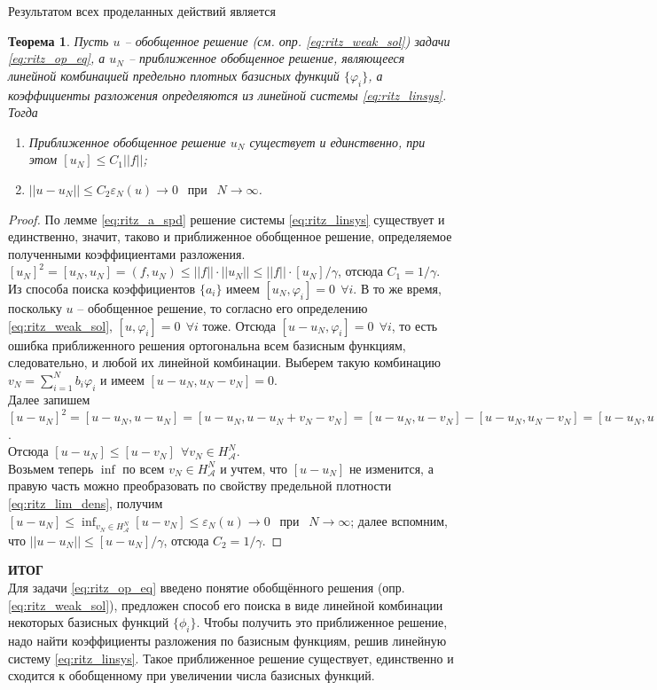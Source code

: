 \documentclass[a4paper, 11pt]{article}
\newtheorem{theorem}{Теорема}
\begin{document}
Результатом всех проделанных действий является
\begin{theorem}
	Пусть $u$ -- обобщенное решение (см. опр. \ref{eq:ritz_weak_sol}) задачи \eqref{eq:ritz_op_eq}, а $u_N$ -- приближенное обобщенное решение, являющееся линейной комбинацией предельно плотных базисных функций $\{\varphi_i\}$, а коэффициенты разложения определяются из линейной системы \eqref{eq:ritz_linsys}. Тогда
	\begin{enumerate}
		\item Приближенное обобщенное решение $u_N$ существует и единственно, при этом $[u_N] \le C_1||f||$;
		\item $||u-u_N|| \le C_2\varepsilon_N(u) \rightarrow 0~~\text{ при } ~~N \rightarrow \infty$.
	\end{enumerate}
\end{theorem}
\begin{proof}
	По лемме \ref{eq:ritz_a_spd} решение системы \eqref{eq:ritz_linsys} существует и единственно, значит, таково и приближенное обобщенное решение, определяемое полученными коэффициентами разложения.\\
	$[u_N]^2 = [u_N, u_N] = (f, u_N) \le ||f||\cdot||u_N|| \le ||f||\cdot[u_N]/\gamma$, отсюда $C_1 = 1/\gamma$.\\
	Из способа поиска коэффициентов $\{a_i\}$ имеем $[u_N,\varphi_i]=0~~\forall i$. В то же время, поскольку $u$ -- обобщенное решение, то согласно его определению \ref{eq:ritz_weak_sol}, $[u,\varphi_i]=0~~\forall i$ тоже. Отсюда $[u-u_N,\varphi_i]=0~~\forall i$, то есть ошибка приближенного решения ортогональна всем базисным функциям, следовательно, и любой их линейной комбинации. Выберем такую комбинацию $v_N = \sum_{i=1}^Nb_i\varphi_i$ и имеем $[u-u_N,u_N-v_N] = 0$.\\
	Далее запишем $[u-u_N]^2 = [u-u_N, u-u_N] = [u-u_N, u-u_N + v_N - v_N] = [u-u_N, u-v_N] - [u-u_N, u_N-v_N] = [u-u_N, u-v_N] \le [u-u_N][u-v_N]$. \\
	Отсюда $[u-u_N] \le [u-v_N]~~\forall v_N \in H_{\mathcal{A}}^N$.\\
	Возьмем теперь $\inf$ по всем $v_N \in H_{\mathcal{A}}^N$ и учтем, что $[u-u_N]$ не изменится, а правую часть можно преобразовать по свойству предельной плотности \eqref{eq:ritz_lim_dens}, получим\\
	$[u-u_N] \le \inf_{v_N \in H_{\mathcal{A}}^N} [u-v_N] \le \varepsilon_N(u) \rightarrow 0~~\text{ при } ~~N \rightarrow \infty$; далее вспомним, что $||u-u_N|| \le [u-u_N]/\gamma$, отсюда $C_2 = 1/\gamma$.
\end{proof}
\textbf{ИТОГ}\\
Для задачи \eqref{eq:ritz_op_eq} введено понятие обобщённого решения (опр. \ref{eq:ritz_weak_sol}), предложен способ его поиска в виде линейной комбинации некоторых базисных функций $\{\phi_i\}$. Чтобы получить это приближенное решение, надо найти коэффициенты разложения по базисным функциям, решив линейную систему \eqref{eq:ritz_linsys}. Такое приближенное решение существует, единственно и сходится к обобщенному при увеличении числа базисных функций.
\end{document}
